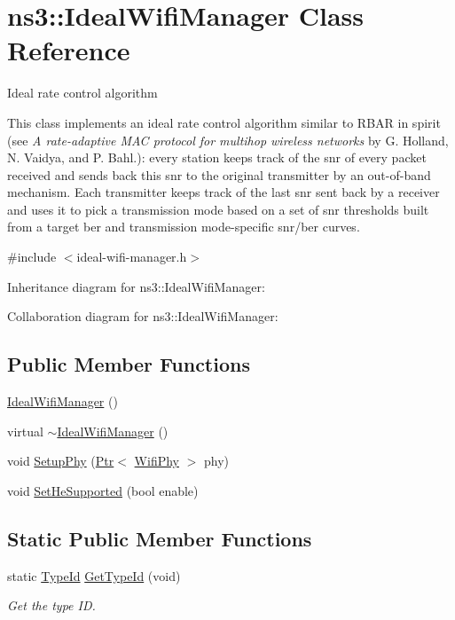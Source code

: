 \hypertarget{classns3_1_1IdealWifiManager}{}\section{ns3\+:\+:Ideal\+Wifi\+Manager Class Reference}
\label{classns3_1_1IdealWifiManager}


Ideal rate control algorithm

This class implements an \textquotesingle{}ideal\textquotesingle{} rate control algorithm similar to R\+B\+AR in spirit (see {\itshape A rate-\/adaptive M\+AC protocol for multihop wireless networks} by G. Holland, N. Vaidya, and P. Bahl.)\+: every station keeps track of the snr of every packet received and sends back this snr to the original transmitter by an out-\/of-\/band mechanism. Each transmitter keeps track of the last snr sent back by a receiver and uses it to pick a transmission mode based on a set of snr thresholds built from a target ber and transmission mode-\/specific snr/ber curves.  




{\ttfamily \#include $<$ideal-\/wifi-\/manager.\+h$>$}



Inheritance diagram for ns3\+:\+:Ideal\+Wifi\+Manager\+:


Collaboration diagram for ns3\+:\+:Ideal\+Wifi\+Manager\+:
\subsection*{Public Member Functions}
\begin{DoxyCompactItemize}
\item 
\hyperlink{classns3_1_1IdealWifiManager_a4d5bed0e67bbea6721accc7084e526c4}{Ideal\+Wifi\+Manager} ()
\item 
virtual \hyperlink{classns3_1_1IdealWifiManager_ae83d746cc97747ef93c14b13b0b580e3}{$\sim$\+Ideal\+Wifi\+Manager} ()
\item 
void \hyperlink{classns3_1_1IdealWifiManager_a6eda44a7d20e9e09e7530a141a80dc03}{Setup\+Phy} (\hyperlink{classns3_1_1Ptr}{Ptr}$<$ \hyperlink{classns3_1_1WifiPhy}{Wifi\+Phy} $>$ phy)
\item 
void \hyperlink{classns3_1_1IdealWifiManager_ad9c8c9fcf2e10badc69da75007366732}{Set\+He\+Supported} (bool enable)
\end{DoxyCompactItemize}
\subsection*{Static Public Member Functions}
\begin{DoxyCompactItemize}
\item 
static \hyperlink{classns3_1_1TypeId}{Type\+Id} \hyperlink{classns3_1_1IdealWifiManager_a98bda34492dd38b9dddeee56113a068d}{Get\+Type\+Id} (void)
\begin{DoxyCompactList}\small\item\em Get the type ID. \end{DoxyCompactList}\end{DoxyCompactItemize}
